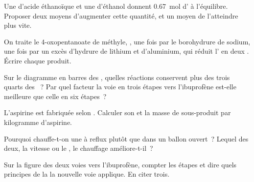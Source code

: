 \begin{exercise}[$\star\star$]\label{exo:g12:synthesis-strategy:6}
Une  d'acide éthanoïque et une  d'éthanol donnent
\qty{0.67}{mol} d' à l'équilibre. Proposer deux moyens d'augmenter
cette quantité, et un moyen de l'atteindre plus vite.
\end{exercise}

\begin{exercise}[$\star\star$]\label{exo:g12:synthesis-strategy:7}
On traite le 4-oxopentanoate de méthyle, ,
une fois par le borohydrure de sodium, une fois par un excès d'hydrure
de lithium et d'aluminium, qui réduit l' en deux . Écrire
chaque produit.
\end{exercise}

\begin{exercise}[$\star\star$]\label{exo:g12:synthesis-strategy:8}
Sur le diagramme en barres des , quelles réactions
conservent plus des trois quarts des ~? Par quel facteur la voie
en trois étapes vers l'ibuprofène est-elle meilleure que celle en six
étapes~?
\end{exercise}

\begin{exercise}[$\star\star$]\label{exo:g12:synthesis-strategy:9}
L'aspirine est fabriquée selon .
Calculer son  et la masse de sous-produit par
kilogramme d'aspirine.
\end{exercise}

\begin{exercise}[$\star\star$]\label{exo:g12:synthesis-strategy:10}
Pourquoi chauffe-t-on une  à reflux plutôt que dans un ballon
ouvert~? Lequel des deux, la vitesse ou le , le chauffage
améliore-t-il~?
\end{exercise}

\begin{exercise}[$\star\star$]\label{exo:g12:synthesis-strategy:11}
Sur la figure des deux voies vers l'ibuprofène, compter les étapes et
dire quels principes de la  la nouvelle voie applique. En
citer trois.
\end{exercise}

